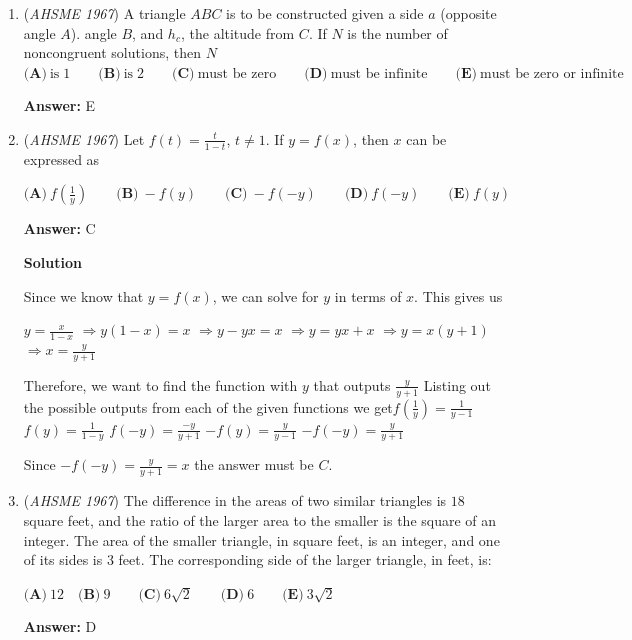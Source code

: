 \begin{enumerate}
 \textbf{Answer: }B


	\item (\textit{AHSME 1967}) A triangle $ABC$ is to be constructed given a side $a$ (opposite angle $A$). angle $B$, and $h_c$, the altitude from $C$.  If $N$ is the number of noncongruent solutions, then $N$
$\textbf{(A)}\ \text{is} \; 1\qquad \textbf{(B)}\ \text{is} \; 2\qquad \textbf{(C)}\ \text{must be zero}\qquad \textbf{(D)}\ \text{must be infinite}\qquad \textbf{(E)}\ \text{must be zero or infinite}$

 \textbf{Answer: }E


	\item (\textit{AHSME 1967}) Let $f(t)=\frac{t}{1-t}$, $t \not= 1$.  If $y=f(x)$, then $x$ can be expressed as 


 $\textbf{(A)}\ f\left(\frac{1}{y}\right)\qquad \textbf{(B)}\ -f(y)\qquad \textbf{(C)}\ -f(-y)\qquad \textbf{(D)}\ f(-y)\qquad \textbf{(E)}\ f(y)$

 \textbf{Answer: }C



\textbf{Solution}

Since we know that $y=f(x)$, we can solve for $y$ in terms of $x$. This gives us

 $y=\frac{x}{1-x}$
$\Rightarrow y(1-x)=x$
$\Rightarrow y-yx=x$
$\Rightarrow y=yx+x$
$\Rightarrow y=x(y+1)$
$\Rightarrow x=\frac{y}{y+1}$

 Therefore, we want to find the function with $y$ that outputs $\frac{y}{y+1}$ Listing out the possible outputs from each of the given functions we get$f\left(\frac{1}{y}\right)=\frac{1}{y-1}$
$f(y)=\frac{1}{1-y}$
$f(-y)=\frac{-y}{y+1}$
$-f(y)=\frac{y}{y-1}$
$-f(-y)=\frac{y}{y+1}$

 Since $-f(-y)=\frac{y}{y+1}=x$ the answer must be $\boxed{C}$.

 


	\item (\textit{AHSME 1967}) The difference in the areas of two similar triangles is $18$ square feet, and the ratio of the larger area to the smaller is the square of an integer.  The area of the smaller triangle, in square feet, is an integer, and one of its sides is $3$ feet.  The corresponding side of the larger triangle, in feet, is:


 $\textbf{(A)}\ 12\quad \textbf{(B)}\ 9\qquad \textbf{(C)}\ 6\sqrt{2}\qquad \textbf{(D)}\ 6\qquad \textbf{(E)}\ 3\sqrt{2}$

 \textbf{Answer: }D




\end{enumerate}
